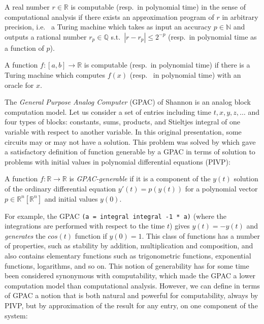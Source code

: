 \documentclass[graybox]{svmult}
\begin{document}
\begin{definition}
A real number $ r \in\mathbb R $ is computable (resp.~in polynomial time) in the sense of computational analysis if there exists an approximation program of $ r $ in arbitrary precision,
i.e.~ a Turing machine which takes as input an accuracy $ p \in \mathbb N $
and outputs  a rational number $ r_p \in \mathbb Q $ s.t.~$ | r-r_p | \le 2 ^{- p} $ (resp.~in polynomial time as a function of $ p $).
\end{definition}

\begin{definition}
A function $ f: [a, b] \rightarrow \mathbb R $ is computable (resp.~in polynomial time) if there is a Turing machine which computes $ f (x) $ (resp.~ in polynomial time) with an oracle for $ x $.
\end{definition}


The \emph{General Purpose Analog Computer} (GPAC) of Shannon \cite{Shannon41} is an analog block computation model.
Let us consider a set of entries including time $ t, x, y, z, \ldots $
and four types of blocks:
constants, sums, products, and Stieltjes integral of one variable with respect to another variable.
In this original presentation, some circuits may or may not have a solution.
This problem was solved by \cite{GC03} which gave a satisfactory definition of function generable by a GPAC
in terms of solution to problems with initial values in polynomial differential equations (PIVP):

\begin{definition} \cite{GC03}
A function $ f: \mathbb{R} \to \mathbb{R} $ is \emph{GPAC-generable} if it is a component of the $ y (t) $ solution
of the ordinary differential equation $ y '(t) = p (y (t)) $ for a polynomial vector $ p \in \mathbb{R} ^ n [\mathbb{R} ^ n]$
and initial values $y(0)$.
\end{definition}

For example, the GPAC \texttt{(a = integral integral -1 * a)} (where the integrations are performed with respect to the time $ t $)
gives $ y (t) = -y (t) $ and \emph{generates} the $ cos (t) $ function if $ y (0) = 1 $.
This class of functions has a number of properties, such as stability by addition, multiplication and composition, and also contains elementary functions such as trigonometric functions, exponential functions, logarithms, and so on.
This notion of generability has for some time been considered synonymous with computability, which made the GPAC a lower computation model than computational analysis. However, we can define in terms of GPAC a notion that is both natural and powerful for computability, always by PIVP, but by approximation of the result for any entry, on one component of the system:
\end{document}
